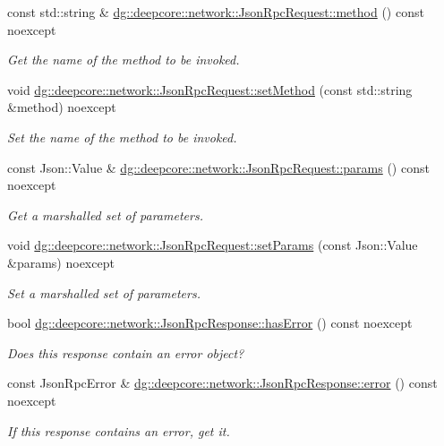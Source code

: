 \begin{DoxyCompactItemize}
const std\+::string \& \hyperlink{group___network_module_gad706357297f0658e1e695cd7164291ef}{dg\+::deepcore\+::network\+::\+Json\+Rpc\+Request\+::method} () const noexcept
\begin{DoxyCompactList}\small\item\em Get the name of the method to be invoked. \end{DoxyCompactList}\item 
void \hyperlink{group___network_module_gab69275c8a35d2df9026f72f91700085e}{dg\+::deepcore\+::network\+::\+Json\+Rpc\+Request\+::set\+Method} (const std\+::string \&method) noexcept
\begin{DoxyCompactList}\small\item\em Set the name of the method to be invoked. \end{DoxyCompactList}\item 
const Json\+::\+Value \& \hyperlink{group___network_module_ga13af70a1e02c7446763e8e44f3484a53}{dg\+::deepcore\+::network\+::\+Json\+Rpc\+Request\+::params} () const noexcept
\begin{DoxyCompactList}\small\item\em Get a marshalled set of parameters. \end{DoxyCompactList}\item 
void \hyperlink{group___network_module_ga2b7b7580f1d8d287c7ef4cf54a381e1e}{dg\+::deepcore\+::network\+::\+Json\+Rpc\+Request\+::set\+Params} (const Json\+::\+Value \&params) noexcept
\begin{DoxyCompactList}\small\item\em Set a marshalled set of parameters. \end{DoxyCompactList}\item 
bool \hyperlink{group___network_module_gaf86a4b609361bdbee6d2bad26ef43c71}{dg\+::deepcore\+::network\+::\+Json\+Rpc\+Response\+::has\+Error} () const noexcept
\begin{DoxyCompactList}\small\item\em Does this response contain an error object? \end{DoxyCompactList}\item 
const Json\+Rpc\+Error \& \hyperlink{group___network_module_ga7a8d72cacfd617c8aa04d3ef973e3d19}{dg\+::deepcore\+::network\+::\+Json\+Rpc\+Response\+::error} () const noexcept
\begin{DoxyCompactList}\small\item\em If this response contains an error, get it. \end{DoxyCompactList}\item 

\end{DoxyCompactItemize}
